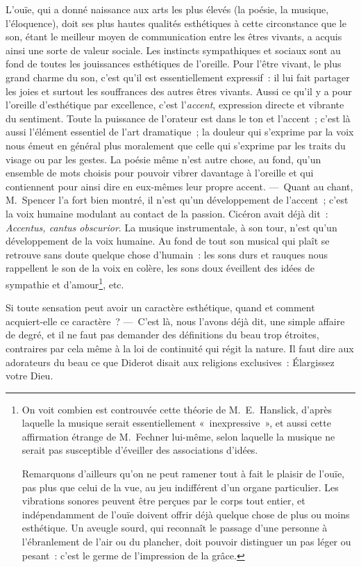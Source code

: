 \documentclass[french,twoside]{book} %
\begin{document}
L’ouïe, qui a donné naissance aux arts les plus élevés (la poésie, la musique, l’éloquence), doit ses plus hautes qualités esthétiques à cette circonstance que le son, étant le meilleur moyen de communication entre les êtres vivants, a acquis ainsi une sorte de valeur sociale. Les instincts sympathiques et sociaux sont au fond de toutes les jouissances esthétiques de l’oreille. Pour l’être vivant, le plus grand charme du son, c’est qu’il est essentiellement expressif : il lui fait partager les joies et surtout les souffrances des autres êtres vivants. Aussi ce qu’il y a pour l’oreille d’esthétique par excellence, c’est l’\emph{accent}, expression directe et vibrante du sentiment. Toute la puissance de l’orateur est dans le ton et l’accent ; c’est là aussi l’élément essentiel de l’art dramatique ; la douleur qui s’exprime par la voix nous émeut en général plus moralement que celle qui s’exprime par les traits du visage ou par les gestes. La poésie même n’est autre chose, au fond, qu’un ensemble de mots choisis pour pouvoir vibrer davantage à l’oreille et qui contiennent pour ainsi dire en eux-mêmes leur propre accent. — Quant au chant, M. Spencer l’a fort bien montré, il n’est qu’un développement de l’accent ; c’est la voix humaine modulant au contact de la passion. Cicéron avait déjà dit : \emph{\emph{Accentus, cantus obscurior}}. La musique instrumentale, à son tour, n’est qu’un développement de la voix humaine. Au fond de tout son musical qui plaît se retrouve sans doute quelque chose d’humain : les sons durs et rauques nous rappellent le son de la voix en colère, les  sons doux éveillent des idées de sympathie et d’amour\footnote{\noindent On voit combien est controuvée cette théorie de Μ. E. Hanslick, d’après laquelle la musique serait essentiellement « inexpressive », et aussi cette affirmation étrange de M. Fechner lui-même, selon laquelle la musique ne serait pas susceptible d’éveiller des associations d’idées.\par
Remarquons d’ailleurs qu’on ne peut ramener tout à fait le plaisir de l’ouïe, pas plus que celui de la vue, au jeu indifférent d’un organe particulier. Les vibrations sonores peuvent être perçues par le corps tout entier, et indépendamment de l’ouïe doivent offrir déjà quelque chose de plus ou moins esthétique. Un aveugle sourd, qui reconnaît le passage d’une personne à l’ébranlement de l’air ou du plancher, doit pouvoir distinguer un pas léger ou pesant : c’est le germe de l’impression de la grâce.
}, etc.\par
Si toute sensation peut avoir un caractère esthétique, quand et comment acquiert-elle ce caractère ? — C’est là, nous l’avons déjà dit, une simple affaire de degré, et il ne faut pas demander des définitions du beau trop étroites, contraires par cela même à la loi de continuité qui régit la nature. Il faut dire aux adorateurs du beau ce que Diderot disait aux religions exclusives : Élargissez votre Dieu.\par
\end{document}
